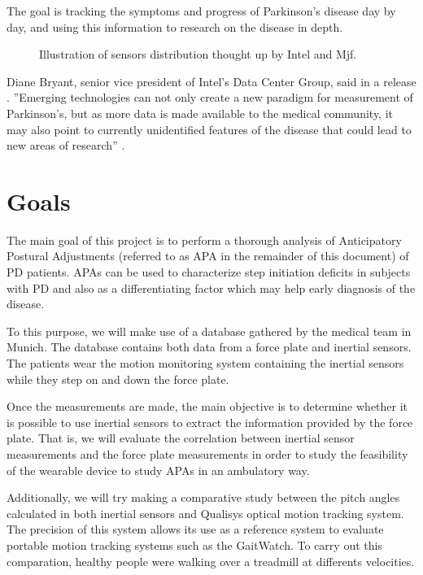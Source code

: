 The goal is tracking the  symptoms and progress of Parkinson’s disease day by day, and using this information to research on the disease in depth.

\begin{figure}[H]
	\centering
	\caption{Illustration of sensors distribution thought up by Intel and Mjf.\cite{IntelAndMjf}}
	\label{fig:IntelAndMjf}
\end{figure}

Diane Bryant, senior vice president of Intel's Data Center Group, said in a release \cite{IntelAndMjf}.
''Emerging technologies can not only create a new paradigm for measurement of Parkinson's, but as more data is made available to the medical community, it may also point to currently unidentified features of the disease that could lead to new areas of research'' .

\section{Goals}

The main goal of this project is to perform a thorough analysis of Anticipatory Postural Adjustments (referred to as APA in the remainder of this document) of PD patients. APAs can be used to characterize step initiation deficits in subjects with PD and also as a differentiating factor which may help early diagnosis of the disease.

To this purpose, we will make use of a database gathered by the medical team in Munich. The database contains both data from a force plate and inertial sensors. The patients wear the motion monitoring system containing the inertial sensors while they step on and down the force plate.

Once the measurements are made, the main objective is to determine whether it is possible to use inertial sensors to extract the information provided by the force plate. That is, we will evaluate the correlation between inertial sensor measurements and the force plate measurements in order to study the feasibility of the wearable device to study APAs in an ambulatory way. 

Additionally, we will try making a comparative study between the pitch angles calculated in both inertial sensors and Qualisys optical motion tracking system. The precision of this system allows its use as a reference system to evaluate portable
motion tracking systems such as the GaitWatch. To carry out this comparation, healthy people were walking over a treadmill at differents velocities.

